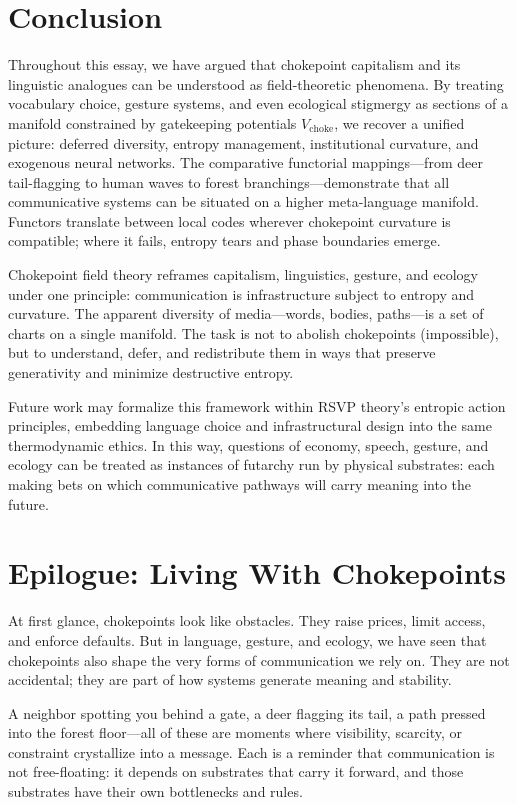 \documentclass[12pt]{article}
\theoremstyle{remark}
\begin{document}
\section{Conclusion}
Throughout this essay, we have argued that chokepoint capitalism and its linguistic analogues can be understood as field-theoretic phenomena. By treating vocabulary choice, gesture systems, and even ecological stigmergy as sections of a manifold constrained by gatekeeping potentials $V_{\text{choke}}$, we recover a unified picture: deferred diversity, entropy management, institutional curvature, and exogenous neural networks. The comparative functorial mappings—from deer tail-flagging to human waves to forest branchings—demonstrate that all communicative systems can be situated on a higher meta-language manifold. Functors translate between local codes wherever chokepoint curvature is compatible; where it fails, entropy tears and phase boundaries emerge.

Chokepoint field theory reframes capitalism, linguistics, gesture, and ecology under one principle: communication is infrastructure subject to entropy and curvature. The apparent diversity of media—words, bodies, paths—is a set of charts on a single manifold. The task is not to abolish chokepoints (impossible), but to understand, defer, and redistribute them in ways that preserve generativity and minimize destructive entropy.

Future work may formalize this framework within RSVP theory’s entropic action principles, embedding language choice and infrastructural design into the same thermodynamic ethics. In this way, questions of economy, speech, gesture, and ecology can be treated as instances of futarchy run by physical substrates: each making bets on which communicative pathways will carry meaning into the future.

\section*{Epilogue: Living With Chokepoints}

At first glance, chokepoints look like obstacles. They raise prices, limit access, and enforce defaults. But in language, gesture, and ecology, we have seen that chokepoints also shape the very forms of communication we rely on. They are not accidental; they are part of how systems generate meaning and stability.

A neighbor spotting you behind a gate, a deer flagging its tail, a path pressed into the forest floor—all of these are moments where visibility, scarcity, or constraint crystallize into a message. Each is a reminder that communication is not free-floating: it depends on substrates that carry it forward, and those substrates have their own bottlenecks and rules.
\end{document}
